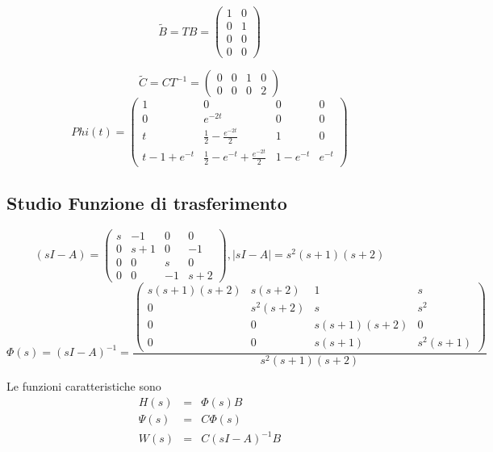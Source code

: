 \documentclass{article}
\begin{document}
\[ \widetilde{B} = T B = \left(\begin{matrix}1 & 0\\0 & 1\\0 & 0\\0 & 0\end{matrix}\right) \]

\[ \widetilde{C} = C T^{-1} = \left(\begin{matrix}0 & 0 & 1 & 0\\0 & 0 & 0 & 2\end{matrix}\right) \]
\[Phi(t) = \left(\begin{matrix}1 & 0 & 0 & 0\\0 & e^{- 2 t} & 0 & 0\\t & \frac{1}{2} - \frac{e^{- 2 t}}{2} & 1 & 0\\t - 1 + e^{- t} & \frac{1}{2} - e^{- t} + \frac{e^{- 2 t}}{2} & 1 - e^{- t} & e^{- t}\end{matrix}\right) \]

\subsection{Studio Funzione di trasferimento}

\[ (sI-A) = \left(\begin{matrix}s & -1 & 0 & 0\\0 & s + 1 & 0 & -1\\0 & 0 & s & 0\\0 & 0 & -1 & s + 2\end{matrix}\right), |sI-A| = s^{2} \left(s + 1\right) \left(s + 2\right) \]
\[ \Phi(s) = (sI-A)^{-1} = \frac{\left(\begin{matrix}s \left(s + 1\right) \left(s + 2\right) & s \left(s + 2\right) & 1 & s\\0 & s^{2} \left(s + 2\right) & s & s^{2}\\0 & 0 & s \left(s + 1\right) \left(s + 2\right) & 0\\0 & 0 & s \left(s + 1\right) & s^{2} \left(s + 1\right)\end{matrix}\right)}{s^{2} \left(s + 1\right) \left(s + 2\right)} \]

Le funzioni caratteristiche sono \[\begin{array}{rcl}  H(s) & = & \Phi(s)B \\ \Psi(s) & = & C \Phi(s)\\ W(s) & = & C(sI-A)^{-1}B  \end{array} \]
\end{document}
